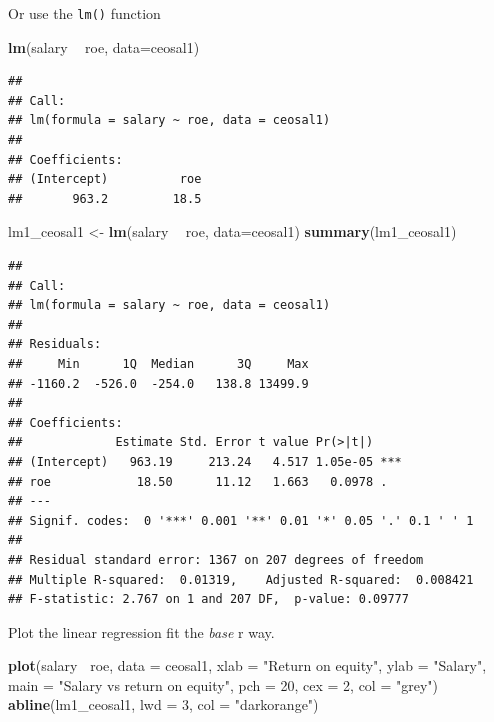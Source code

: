 \documentclass[]{book}
\newenvironment{Shaded}{\begin{snugshade}}{\end{snugshade}}
\newcommand{\DataTypeTok}[1]{\textcolor[rgb]{0.13,0.29,0.53}{#1}}
\newcommand{\DecValTok}[1]{\textcolor[rgb]{0.00,0.00,0.81}{#1}}
\newcommand{\KeywordTok}[1]{\textcolor[rgb]{0.13,0.29,0.53}{\textbf{#1}}}
\newcommand{\NormalTok}[1]{#1}
\newcommand{\OperatorTok}[1]{\textcolor[rgb]{0.81,0.36,0.00}{\textbf{#1}}}
\newcommand{\StringTok}[1]{\textcolor[rgb]{0.31,0.60,0.02}{#1}}
\begin{document}
Or use the \texttt{lm()} function

\begin{Shaded}
\begin{Highlighting}[]
\KeywordTok{lm}\NormalTok{(salary }\OperatorTok{~}\StringTok{ }\NormalTok{roe, }\DataTypeTok{data=}\NormalTok{ceosal1)}
\end{Highlighting}
\end{Shaded}

\begin{verbatim}
## 
## Call:
## lm(formula = salary ~ roe, data = ceosal1)
## 
## Coefficients:
## (Intercept)          roe  
##       963.2         18.5
\end{verbatim}

\begin{Shaded}
\begin{Highlighting}[]
\NormalTok{lm1_ceosal1 <-}\StringTok{ }\KeywordTok{lm}\NormalTok{(salary }\OperatorTok{~}\StringTok{ }\NormalTok{roe, }\DataTypeTok{data=}\NormalTok{ceosal1) }
\KeywordTok{summary}\NormalTok{(lm1_ceosal1)}
\end{Highlighting}
\end{Shaded}

\begin{verbatim}
## 
## Call:
## lm(formula = salary ~ roe, data = ceosal1)
## 
## Residuals:
##     Min      1Q  Median      3Q     Max 
## -1160.2  -526.0  -254.0   138.8 13499.9 
## 
## Coefficients:
##             Estimate Std. Error t value Pr(>|t|)    
## (Intercept)   963.19     213.24   4.517 1.05e-05 ***
## roe            18.50      11.12   1.663   0.0978 .  
## ---
## Signif. codes:  0 '***' 0.001 '**' 0.01 '*' 0.05 '.' 0.1 ' ' 1
## 
## Residual standard error: 1367 on 207 degrees of freedom
## Multiple R-squared:  0.01319,    Adjusted R-squared:  0.008421 
## F-statistic: 2.767 on 1 and 207 DF,  p-value: 0.09777
\end{verbatim}

Plot the linear regression fit the \emph{base} r way.

\begin{Shaded}
\begin{Highlighting}[]
\KeywordTok{plot}\NormalTok{(salary}\OperatorTok{~}\StringTok{ }\NormalTok{roe, }\DataTypeTok{data =}\NormalTok{ ceosal1,}
     \DataTypeTok{xlab =} \StringTok{"Return on equity"}\NormalTok{,}
     \DataTypeTok{ylab =} \StringTok{"Salary"}\NormalTok{,}
     \DataTypeTok{main =} \StringTok{"Salary vs return on equity"}\NormalTok{,}
     \DataTypeTok{pch  =} \DecValTok{20}\NormalTok{,}
     \DataTypeTok{cex  =} \DecValTok{2}\NormalTok{,}
     \DataTypeTok{col  =} \StringTok{"grey"}\NormalTok{)}
\KeywordTok{abline}\NormalTok{(lm1_ceosal1, }\DataTypeTok{lwd =} \DecValTok{3}\NormalTok{, }\DataTypeTok{col =} \StringTok{"darkorange"}\NormalTok{)}
\end{Highlighting}
\end{Shaded}
\end{document}
